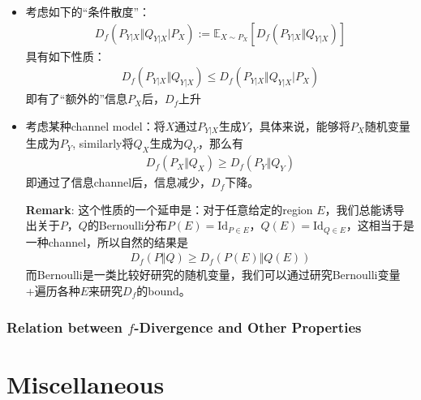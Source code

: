 \documentclass[11pt,a4paper]{ctexart}
\numberwithin{equation}{section}%
\begin{document}
\begin{itemize}[topsep=2pt,itemsep=0pt]
    \item 考虑如下的“条件散度”：
    \begin{align*}
        D_f\left(P_{Y|X}\Vert Q_{Y|X}\big| P_X\right) := \mathbb{E}_{X\sim P_X}\left[ D_f\left(P_{Y|X}\Vert Q_{Y|X}\right) \right] 
    \end{align*}
    具有如下性质：
    \begin{align*}
        D_f\left(P_{Y|X}\Vert Q_{Y|X}\right) \leq D_f\left(P_{Y|X}\Vert Q_{Y|X}\big| P_X\right) 
    \end{align*}
    即有了“额外的”信息$ P_X $后，$ D_f $上升
    \item 考虑某种channel model：将$ X $通过$ P_{Y|X} $生成$ Y $，具体来说，能够将$ P_X $随机变量生成为$ P_Y $, similarly将$Q_X$生成为$ Q_Y $，那么有
    \begin{align*}
         D_f(P_X\Vert Q_X) \geq D_f(P_Y\Vert Q_Y)
    \end{align*}
    即通过了信息channel后，信息减少，$ D_f $下降。

    \textbf{Remark}: 这个性质的一个延申是：对于任意给定的region $ E $，我们总能诱导出关于$ P $，$ Q $的Bernoulli分布$ P(E) = \mathrm{Id}_{P\in E} $，$ Q(E) = \mathrm{Id}_{Q\in E} $，这相当于是一种channel，所以自然的结果是
    \begin{align*}
        D_f(P\Vert Q) \geq D_f(P(E)\Vert Q(E))
    \end{align*}
    而Bernoulli是一类比较好研究的随机变量，我们可以通过研究Bernoulli变量+遍历各种$ E $来研究$ D_f $的bound。
\end{itemize}

    

\subsubsection{Relation between $ f $-Divergence and Other Properties}

















    






\section{Miscellaneous}
\end{document}
